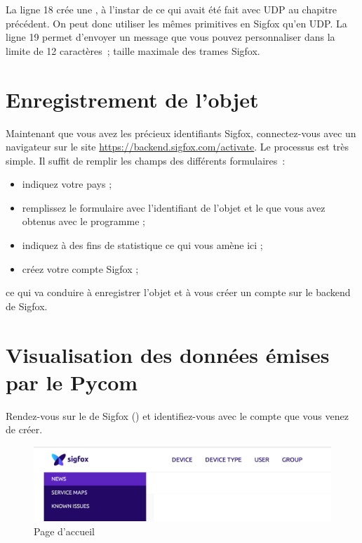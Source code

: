 La ligne 18 crée une , à l’instar de ce qui avait été fait avec UDP au chapitre précédent. On peut donc utiliser les mêmes primitives en Sigfox qu’en UDP. La ligne 19 permet d’envoyer un message que vous pouvez personnaliser dans la limite de 12 caractères~; taille maximale des trames Sigfox.


\section{Enregistrement de l'objet}


Maintenant que vous avez les précieux identifiants Sigfox, connectez-vous avec un navigateur sur le site \url{https://backend.sigfox.com/activate}. Le processus est très simple. Il suffit de remplir les champs des différents formulaires~:

\begin{itemize}
    \item indiquez votre pays ;
\item remplissez le formulaire avec l'identifiant de l'objet et le  que vous avez obtenus avec le programme  ;
\item indiquez à des fins de statistique ce qui vous amène ici ;
\item créez votre compte Sigfox ;
\end{itemize}

ce qui va conduire à enregistrer l’objet et à vous créer un compte sur le backend de Sigfox.

\section{Visualisation des données émises par le Pycom}


Rendez-vous sur le  de Sigfox () et identifiez-vous avec le compte que vous venez de créer.

\begin{figure}[tbp]
\centerline{\includegraphics[width=1\columnwidth]{Pictures/sigfox-accueil.png} }
\caption{Page d'accueil}
\label{fig-sigfox-accueil}
\end{figure}



